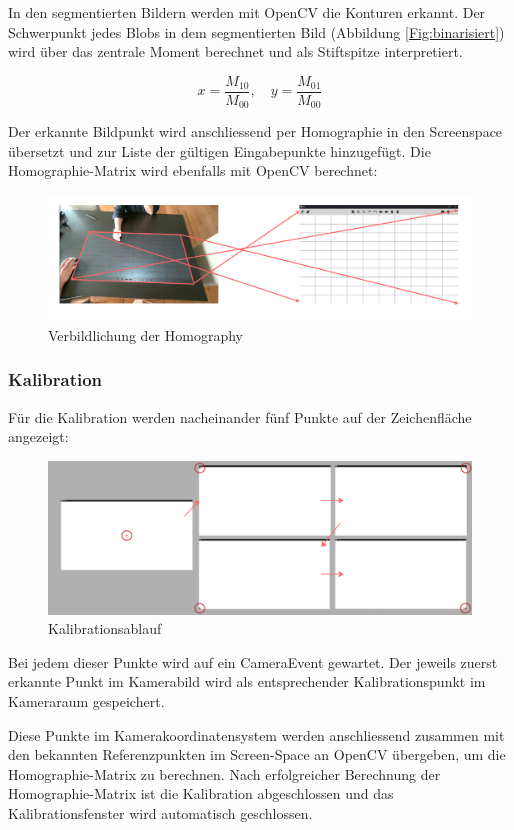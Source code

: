 In den segmentierten Bildern werden mit OpenCV die Konturen erkannt. Der Schwerpunkt jedes Blobs in dem segmentierten Bild (Abbildung \ref{Fig:binarisiert}) wird über das zentrale Moment berechnet und als Stiftspitze interpretiert.

\[
x = \frac{M_{10}}{M_{00}}, \quad y = \frac{M_{01}}{M_{00}}
\]
\clearpage

Der erkannte Bildpunkt wird anschliessend per Homographie in den Screenspace übersetzt und zur Liste der gültigen Eingabepunkte hinzugefügt. Die Homographie-Matrix wird ebenfalls mit OpenCV berechnet:

\begin{figure}[H]
    \centering
    \includegraphics[width=0.9\linewidth]{graphics/homography_graphic.png}
    \caption{Verbildlichung der Homography}
    \label{fig:enter-label}
\end{figure}

\vspace{0.5em}
\subsubsection{Kalibration}

Für die Kalibration werden nacheinander fünf Punkte auf der Zeichenfläche angezeigt:

\begin{figure}[H]
    \centering
    \includegraphics[width=0.9\linewidth]{graphics/ablauf_kalibration.png}
    \caption{Kalibrationsablauf}
    \label{fig:placeholder}
\end{figure}

Bei jedem dieser Punkte wird auf ein CameraEvent gewartet. Der jeweils zuerst erkannte Punkt im Kamerabild wird als entsprechender Kalibrationspunkt im Kameraraum gespeichert.

Diese Punkte im Kamerakoordinatensystem werden anschliessend zusammen mit den bekannten Referenzpunkten im Screen-Space an OpenCV übergeben, um die Homographie-Matrix zu berechnen. Nach erfolgreicher Berechnung der Homographie-Matrix ist die Kalibration abgeschlossen und das Kalibrationsfenster wird automatisch geschlossen.

